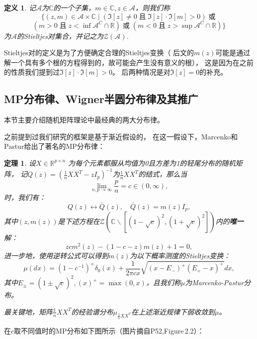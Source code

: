 \documentclass[UTF8,12pt]{ctexart}
\newtheorem{definition}{定义}
\newtheorem{theorem}{定理}
\begin{document}
\begin{definition}
    记$\mathcal{A}$为$\mathbb C$的一个子集，$m \in \mathbb C, z \in \mathcal{A}$，则我们称
    \[
        \{(z,m)\in\mathcal A \times \mathbb C \;|\; 
        (\Im[z]\neq 0 \;\text{且} \; \Im [z] \cdot \Im[m]>0) \;\text{或}\; 
    \]
    \[
        (m>0 \;\text{且}\; z < \inf \mathcal A^C \cap \mathbb R) \;\text{或}\; 
        (m<0 \;\text{且}\; z>\sup\mathcal A^C \cap \mathbb R) \}  
    \]
    为$\mathcal A$的Stieltjes对集合，并记之为$\mathcal Z (\mathcal A)$.
\end{definition}

Stieltjes对的定义是为了方便确定合理的Stieltjes变换（
后文的$m(z)$可能是通过解一个具有多个根的方程得到的，故可能会产生没有意义的根），
这是因为在之前的性质我们提到过$\Im [z] \cdot \Im[m]>0$。
后两种情况是对$\Im[z] = 0$的补充。

\subsection{MP分布律、Wigner半圆分布律及其推广}

本节主要介绍随机矩阵理论中最经典的两大分布律。

之前提到过我们研究的框架是基于渐近假设的，
在这一假设下，Marcenko和Pastur给出了著名的MP分布律\cite{MP1}：

\begin{theorem}\label{MPLaw}
    设$X \in \mathbb R ^{p\times n}$ 为每个元素都服从均值为0且方差为1的轻尾分布的随机矩阵，
    记$Q(z)={(\frac{1}{n}XX^T-zI_p)}^{-1}$为$\frac{1}{n}XX^T$的结式，那么当
    \[
        \lim\limits_{n,p \rightarrow \infty}\frac{p}{n} = c \in (0,\infty),
    \]  
    时，我们有：
    \[
        Q(z) \leftrightarrow \bar{Q}(z), \quad \bar{Q}(z) = m(z)I_p,
    \]
    其中$(z,m(z))$是下述方程在$\mathcal Z (\mathbb C \backslash [{(1-\sqrt{c})}^2
    ,{(1+\sqrt c)}^2])$内的\textbf{唯一}解：
    \[
        zcm^2(z)-(1-c-z)m(z)+1 = 0,
    \]  
    进一步地，使用逆转公式可以得到$m(z)$为以下概率测度的Stieltjes变换：
    \[
        \mu(dx) = {(1-c^{-1})}^+ \delta_0(x) + \frac{1}{2\pi cx}\sqrt{
            {(x-E_-)}^+ {(E_+ -x)}^+
        }dx,
    \]
    其中$E_{\pm} = {(1\pm\sqrt{c})}^2, {(x)}^+ = \max(0,x)$，且我们称$\mu$为Marcenko-Pastur分布。
    
最关键地，矩阵$\frac{1}{n}XX^T$的经验谱分布$\mu_{\frac{1}{n}XX^T}$在上述渐近规律下弱收敛到$\mu$。
\end{theorem}

在$c$取不同值时的MP分布如下图所示（图片摘自\cite{couillet_liao_2022}P52,Figure\,2.2）：
\end{document}
